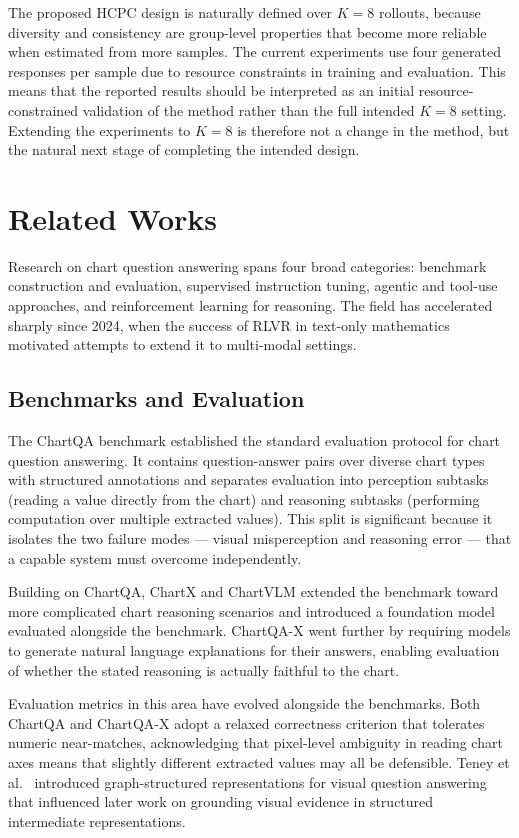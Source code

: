 \documentclass{iutbscthesis}
\begin{document}
The proposed HCPC design is naturally defined over $K=8$ rollouts, because diversity and consistency are group-level properties that become more reliable when estimated from more samples. The current experiments use four generated responses per sample due to resource constraints in training and evaluation. This means that the reported results should be interpreted as an initial resource-constrained validation of the method rather than the full intended $K=8$ setting. Extending the experiments to $K=8$ is therefore not a change in the method, but the natural next stage of completing the intended design.


\chapter{Related Works} \label{chapter:related}

Research on chart question answering spans four broad categories: benchmark construction and evaluation, supervised instruction tuning, agentic and tool-use approaches, and reinforcement learning for reasoning. The field has accelerated sharply since 2024, when the success of RLVR in text-only mathematics motivated attempts to extend it to multi-modal settings.

\section{Benchmarks and Evaluation}

The ChartQA benchmark \cite{masry2022chartqa} established the standard evaluation protocol for chart question answering. It contains question-answer pairs over diverse chart types with structured annotations and separates evaluation into perception subtasks (reading a value directly from the chart) and reasoning subtasks (performing computation over multiple extracted values). This split is significant because it isolates the two failure modes --- visual misperception and reasoning error --- that a capable system must overcome independently.

Building on ChartQA, ChartX and ChartVLM \cite{xia2024chartx} extended the benchmark toward more complicated chart reasoning scenarios and introduced a foundation model evaluated alongside the benchmark. ChartQA-X \cite{hegde2026chartqax} went further by requiring models to generate natural language explanations for their answers, enabling evaluation of whether the stated reasoning is actually faithful to the chart.

Evaluation metrics in this area have evolved alongside the benchmarks. Both ChartQA and ChartQA-X adopt a relaxed correctness criterion that tolerates numeric near-matches, acknowledging that pixel-level ambiguity in reading chart axes means that slightly different extracted values may all be defensible. Teney et al.\ \cite{teney2017graph} introduced graph-structured representations for visual question answering that influenced later work on grounding visual evidence in structured intermediate representations.
\end{document}
